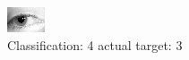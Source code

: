 \begin{figure}[h!]
\begin{center}
\includegraphics[width=0.60\columnwidth]{figures/ID1341_class_4_target_3.png}
\end{center}
\caption{ Classification: 4 actual target: 3}
\label{fig:ID1341_class_4_target_3}
\end{figure}
